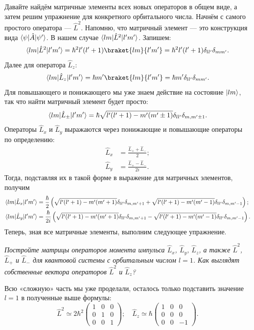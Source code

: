 Давайте найдём матричные элементы всех новых операторов в общем виде, а затем
решим упражнение для конкретного орбитального числа. Начнём с самого простого
оператора --- $\hat{L}^2$. Напомню, что матричный элемент --- это конструкция
вида $\langle\psi\rvert\hat{A}\lvert\psi'\rangle$. В нашем случае
$\langle lm\rvert\hat{L}^2\lvert l'm'\rangle$. Запишем:
\[
  \bra{lm}\hat{L}^2\ket{l'm'} = \hbar^2l'(l'+1)\braket{lm}{l'm'} = \hbar^2l'(l'+1)\delta_{ll'}\delta_{mm'}.
\]
Далее для оператора $\hat{L}_z$:
\[
  \bra{lm}\hat{L}_z\ket{l'm'} = \hbar m'\braket{lm}{l'm'} = \hbar m'\delta_{ll'}\delta_{mm'}.
\]
Для повышающего и понижающего мы уже знаем действие на состояние $\lvert lm\rangle$,
так что найти матричный элемент будет просто:
\[
  \langle lm\rvert\hat{L}_{\pm}\lvert l'm'\rangle = \hbar\sqrt{l'(l'+1) - m'(m' \pm 1)}\delta_{ll'}\delta_{m,m'\pm 1}.
\]
Операторы $\hat{L}_x$ и $\hat{L}_y$ выражаются через понижающие и повышающие
операторы по определению:
\begin{align*}
  \hat{L}_x & = \frac{\hat{L}_+ + \hat{L}_-}{2};\\
  \hat{L}_y & = \frac{\hat{L}_+ - \hat{L}_-}{2i}.
\end{align*}
Тогда, подставляя их в такой форме в выражение для матричных элементов, получим
\begin{align*}
  \langle lm\rvert\hat{L}_{x}\lvert l'm'\rangle &= \frac{\hbar}{2}\left(\sqrt{l'(l'+1) - m'(m' + 1)}\delta_{ll'}\delta_{m,m' + 1} + \sqrt{l'(l'+1) - m'(m' - 1)}\delta_{ll'}\delta_{m,m' - 1}\right);\\
  \langle lm\rvert\hat{L}_{y}\lvert l'm'\rangle &= \frac{\hbar}{2i}\left(\sqrt{l'(l'+1) - m'(m' + 1)}\delta_{ll'}\delta_{m,m' + 1} - \sqrt{l'(l'+1) - m'(m' - 1)}\delta_{ll'}\delta_{m,m' - 1}\right).
\end{align*}
Теперь, зная все матричные элементы, выполним следующее упражнение.
\begin{exercise}\label{ex:angular-momentum-matrices}
  \textit{Постройте матрицы операторов момента импульса $\hat{L}_x$, $\hat{L}_y$,
    $\hat{L}_z$, а также $\hat{L}^2$, $\hat{L}_+$ и $\hat{L}_-$ для квантовой
    системы с орбитальным числом $l = 1$. Как выглядят собственные вектора
    операторов $\hat{L}^2$ и $\hat{L}_z$?}
\end{exercise}

Всю «сложную» часть мы уже проделали, осталось только подставить значение $l =
  1$ в полученные выше формулы:
\[
  \hat{L}^2 \simeq 2\hbar^2 \begin{pmatrix}
    1 & 0 & 0 \\ 0 & 1 & 0 \\ 0 & 0 & 1
  \end{pmatrix}; \quad
  \hat{L}_z \simeq \hbar \begin{pmatrix}
    1 & 0 & 0 \\ 0 & 0 & 0 \\ 0 & 0 & -1
  \end{pmatrix}.
\]

